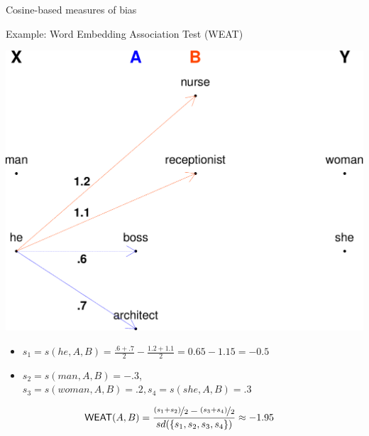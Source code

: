 \documentclass[10pt,ignorenonframetext,x11names, dvipsnames, bibspacing,natbib]{beamer}
\begin{document}
\begin{frame}{Cosine-based measures of bias}

\begin{block}{Example: Word Embedding Association Test (WEAT)}

\vspace{1mm} \footnotesize

\begin{center}\includegraphics[width=0.55\linewidth]{presentationESSLLI_files/figure-beamer/unnamed-chunk-2-1} \end{center}

\normalsize

\pause

\footnotesize 

\begin{itemize}
\item
  \(s_1 = s(he,A,B) = \frac{.6+.7}{2} - \frac{1.2+1.1}{2} = 0.65-1.15= -0.5\)
\item
  \(s_2 = s(man,A,B) = -.3\),
  \linebreak  \(s_3 = s(woman,A,B) = .2, s_4 = s(she, A, B) = .3\)
\end{itemize}

\vspace{-4mm}

\normalsize 

\begin{align*}
\mathsf{WEAT}(A,B) & = \frac{\nicefrac{(s_1+s_2)}{2} - \nicefrac{(s_3+s_4)}{2}}{sd(\{s_1,s_2,s_3,s_4\})} \approx - 1.95
\end{align*}

\end{block}

\end{frame}
\end{document}
